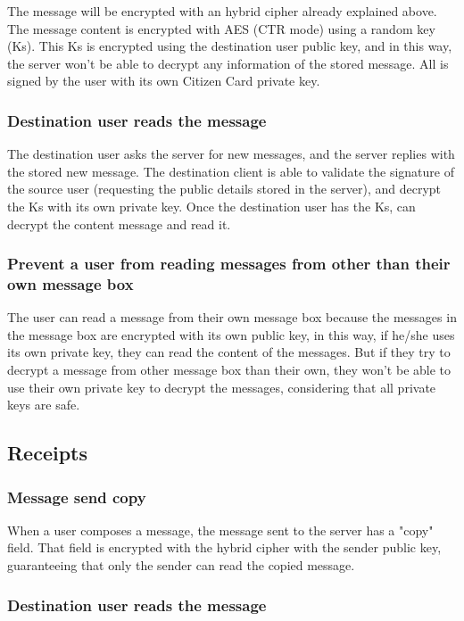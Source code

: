 \documentclass[pdftex,12pt,a4paper]{report}
\begin{document}
The message will be encrypted with an hybrid cipher already explained above. The message content is encrypted with AES (CTR mode) using a random key (Ks). This Ks is encrypted using the destination user public key, and in this way, the server won't be able to decrypt any information of the stored message. All is signed by the user with its own Citizen Card private key.

\subsubsection{Destination user reads the message}

The destination user asks the server for new messages, and the server replies with the stored new message. The destination client is able to validate the signature of the source user (requesting the public details stored in the server), and decrypt the Ks with its own private key. Once the destination user has the Ks, can decrypt the content message and read it.

\subsubsection{Prevent a user from reading messages from other than their own message box}

The user can read a message from their own message box because the messages in the message box are encrypted with its own public key, in this way, if he/she uses its own private key, they can read the content of the messages. But if they try to decrypt a message from other message box than their own, they won't be able to use their own private key to decrypt the messages, considering that all private keys are safe.

\subsection{Receipts}

\subsubsection{Message send copy}

When a user composes a message, the message sent to the server has a "copy" field. That field is encrypted with the hybrid cipher with the sender public key, guaranteeing that only the sender can read the copied message.

\subsubsection{Destination user reads the message}
\end{document}
